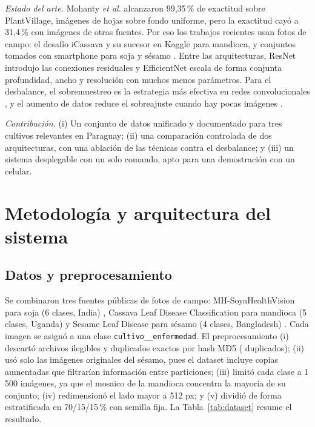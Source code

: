 \documentclass[conference]{IEEEtran}
\begin{document}
\textit{Estado del arte.} Mohanty \textit{et al.} \cite{mohanty2016} alcanzaron 99,35\,\% de exactitud sobre PlantVillage, im\'agenes de hojas sobre fondo uniforme, pero la exactitud cay\'o a 31,4\,\% con im\'agenes de otras fuentes. Por eso los trabajos recientes usan fotos de campo: el desaf\'io iCassava \cite{mwebaze2019icassava} y su sucesor en Kaggle \cite{kaggle2020cassava} para mandioca, y conjuntos tomados con smartphone para soja \cite{shinde2024soya} y s\'esamo \cite{sesame2025dataset}. Entre las arquitecturas, ResNet \cite{he2016resnet} introdujo las conexiones residuales y EfficientNet \cite{tan2019efficientnet} escala de forma conjunta profundidad, ancho y resoluci\'on con muchos menos par\'ametros. Para el desbalance, el sobremuestreo es la estrategia m\'as efectiva en redes convolucionales \cite{buda2018imbalance}, y el aumento de datos reduce el sobreajuste cuando hay pocas im\'agenes \cite{shorten2019augmentation}.

\textit{Contribuci\'on.} (i) Un conjunto de datos unificado y documentado para tres cultivos relevantes en Paraguay; (ii) una comparaci\'on controlada de dos arquitecturas, con una ablaci\'on de las t\'ecnicas contra el desbalance; y (iii) un sistema desplegable con un solo comando, apto para una demostraci\'on con un celular.

\section{Metodolog\'ia y arquitectura del sistema}

\subsection{Datos y preprocesamiento}
Se combinaron tres fuentes p\'ublicas de fotos de campo: MH-SoyaHealthVision para soja (6 clases, India) \cite{shinde2024soya}, Cassava Leaf Disease Classification para mandioca (5 clases, Uganda) \cite{kaggle2020cassava} y Sesame Leaf Disease para s\'esamo (4 clases, Bangladesh) \cite{sesame2025dataset}. Cada imagen se asign\'o a una clase \texttt{cultivo\_\_enfermedad}. El preprocesamiento (i) descart\'o archivos ilegibles y duplicados exactos por hash MD5 (\dsDup{} duplicados); (ii) us\'o solo las im\'agenes originales del s\'esamo, pues el dataset incluye copias aumentadas que filtrar\'ian informaci\'on entre particiones; (iii) limit\'o cada clase a 1\,500 im\'agenes, ya que el mosaico de la mandioca concentra la mayor\'ia de su conjunto; (iv) redimension\'o el lado mayor a 512 px; y (v) dividi\'o de forma estratificada en 70/15/15\,\% con semilla fija. La Tabla~\ref{tab:dataset} resume el resultado.
\end{document}
